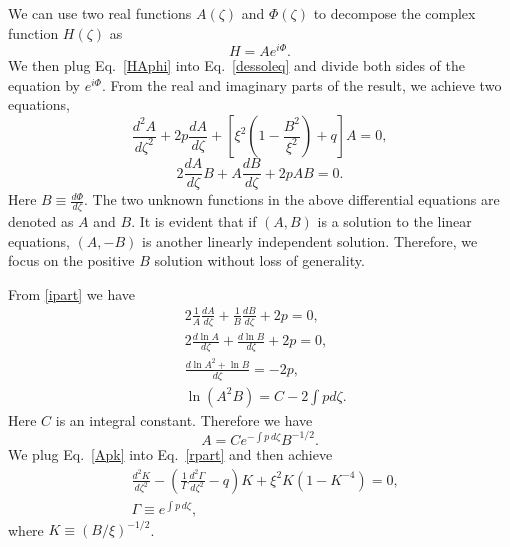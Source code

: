 \documentclass[prd,aps,a4paper,superscriptaddress,onecolumn,nofootinbib]{revtex4}
\begin{document}
We can use two real functions $A(\zeta)$ and $\Phi(\zeta)$ to decompose the complex function $H(\zeta)$ as
\begin{equation}\label{HAphi}
    H=Ae^{i\Phi}.
\end{equation}
We then plug Eq.~\eqref{HAphi} into Eq.~\eqref{dessoleq} and divide both sides of the equation by $e^{i\Phi}$.
From the real and imaginary parts of the result, we achieve two equations,
\begin{equation}\label{rpart}
    \frac{d^2 A}{d\zeta^2}+2p\frac{d A}{d\zeta}+\left[\xi^2\left(1-\frac{B^2}{\xi^2}\right)+q\right]A=0,
\end{equation}
\begin{equation}\label{ipart}
    2\frac{d A}{d\zeta}B+A\frac{d B}{d\zeta}+2pAB=0.
\end{equation}
Here $B\equiv\frac{d \Phi}{d\zeta}$.
The two unknown functions in the above differential equations are denoted as $A$ and $B$. It is evident that if $(A, B)$ is a solution to the linear equations, $(A, -B)$ is another linearly independent solution. Therefore, we focus on the positive $B$ solution without loss of generality.

From \eqref{ipart} we have
\begin{align}
&    2\frac{1}{A}\frac{d A}{d\zeta}+\frac{1}{B}\frac{d B}{d\zeta}+2p=0,\\
&    2\frac{d \ln A}{d\zeta}+\frac{d \ln B}{d\zeta}+2p=0,\\
&    \frac{d \ln A^2+\ln B}{d\zeta}=-2p,\\
&    \ln(A^2B)=C-2\int pd\zeta.
\end{align}
Here $C$ is an integral constant. Therefore we have
\begin{equation}\label{Apk}
    A=Ce^{-\int p\,d\zeta}B^{-1/2}.
\end{equation}
We plug Eq.~\eqref{Apk} into Eq.~\eqref{rpart} and then achieve
\begin{align}
    &\frac{d^2 K}{d\zeta^2}-\left(\frac{1}{\Gamma}\frac{d^2\Gamma}{d\zeta^2}-q\right)K+\xi^2K(1-K^{-4})=0,\label{equK0}\\
    &\Gamma\equiv e^{\int p \,d\zeta},\label{eq5}
\end{align}
where $K\equiv(B/\xi)^{-1/2}$.
\end{document}
